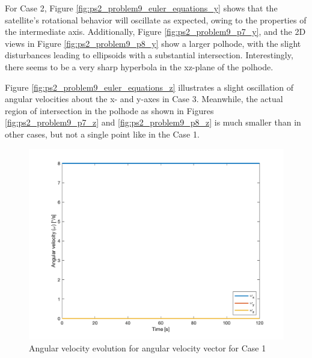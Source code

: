For Case 2, Figure \ref{fig:ps2_problem9_euler_equations_y} shows that the satellite's rotational behavior will oscillate as expected, owing to the properties of the intermediate axis. Additionally, Figure \ref{fig:ps2_problem9_p7_y}, and the 2D views in Figure \ref{fig:ps2_problem9_p8_y} show a larger polhode, with the slight disturbances leading to ellipsoids with a substantial intersection. Interestingly, there seems to be a very sharp hyperbola in the xz-plane of the polhode.

Figure \ref{fig:ps2_problem9_euler_equations_z} illustrates a slight oscillation of angular velocities about the x- and y-axes in Case 3. Meanwhile, the actual region of intersection in the polhode as shown in Figures \ref{fig:ps2_problem9_p7_z} and \ref{fig:ps2_problem9_p8_z} is much smaller than in other cases, but not a single point like in the Case 1.

\begin{figure}[H]
\centering
\includegraphics[scale=0.6]{Images/ps2_problem9_euler_equations_x.png}
\caption{Angular velocity evolution for angular velocity vector for Case 1}
\label{fig:ps2_problem9_euler_equations_x}
\end{figure}

